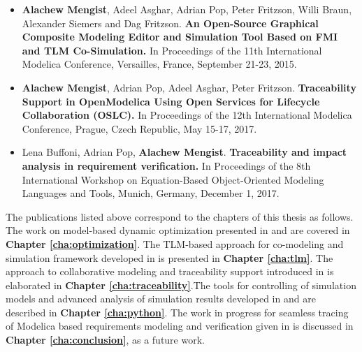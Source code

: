 \begin{itemize}
\item[\begin{NoHyper} \cite{alachewtlm} \end{NoHyper}]  \textbf{Alachew Mengist}, Adeel Asghar, Adrian Pop, Peter Fritzson, Willi Braun, Alexander Siemers and Dag Fritzson.\textbf{ An Open-Source Graphical Composite Modeling Editor and Simulation Tool Based on FMI and TLM Co-Simulation.} In Proceedings of the 11th International Modelica Conference, Versailles, France, September 21-23, 2015. 


\item[\begin{NoHyper} \cite{alachewtraceability} \end{NoHyper}]  \textbf{Alachew Mengist}, Adrian Pop, Adeel Asghar, Peter Fritzson. \textbf{Traceability Support in OpenModelica Using Open Services for Lifecycle Collaboration (OSLC).} In Proceedings of the 12th International Modelica Conference, Prague, Czech Republic, May 15-17, 2017. 

\item[\begin{NoHyper} \cite{alachewrequirementstraceability} \end{NoHyper}]  Lena Buffoni, Adrian Pop, \textbf{Alachew Mengist}. \textbf{Traceability and impact analysis in requirement verification.} In Proceedings of the 8th International Workshop on Equation-Based Object-Oriented Modeling Languages and Tools, Munich, Germany, December 1, 2017. 

\end{itemize}

The publications listed above correspond to the chapters of this thesis as follows. The work on model-based dynamic optimization presented in \cite{alachewoptimization} and \cite{alachewoptimizationdemo} are covered in  \textbf{Chapter \ref{cha:optimization}}. The TLM-based approach for co-modeling and simulation framework developed in \cite{alachewtlm} is presented in \textbf{Chapter \ref{cha:tlm}}. The approach to collaborative modeling and traceability support introduced in \cite{alachewtraceability} is elaborated in \textbf{Chapter \ref{cha:traceability}}.The tools for controlling of simulation models and advanced analysis of simulation results developed in \cite{alachewompython} and \cite{alachewpysimulator} are described in \textbf{Chapter \ref{cha:python}}.  The work in progress for seamless tracing of Modelica based requirements modeling and verification given in \cite{alachewrequirementstraceability} is discussed in \textbf{Chapter \ref{cha:conclusion}}, as a future work.



